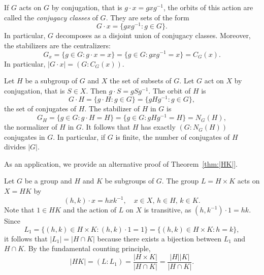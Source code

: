 \begin{example}
    If $G$ acts on $G$ by conjugation, that is $g\cdot x=gxg^{-1}$, the orbits of this action are called the \emph{conjugacy classes} 
    of $G$. They are sets of the form
        \[
        G\cdot x=\{gxg^{-1}:g\in G\}.
        \]
    In particular, $G$ decomposes as a disjoint union of conjugacy classes. Moreover, 
    the stabilizers are the centralizers:
        \[
        G_x=\{g\in G:g\cdot x=x\}=\{g\in G:gxg^{-1}=x\}=C_G(x).
        \]
    In particular, $|G\cdot x|=(G:C_G(x))$.
\end{example}

\begin{example}
\label{xca:counting_conjugates}
    Let $H$ be a subgroup of $G$ and $X$ the set of subsets of $G$. Let $G$ act on 
    $X$ by conjugation, that is $S\in X$. Then
        $g\cdot S=gSg^{-1}$. The orbit of $H$ 
        is 
        \[
        G\cdot H=\{g\cdot H:g\in G\}=\{gHg^{-1}:g\in G\},
        \]
        the set of conjugates of $H$. The stabilizer of $H$ in $G$ 
        is 
        \[
        G_H=\{g\in G:g\cdot H=H\}=\{g\in G:gHg^{-1}=H\}=N_G(H),
        \]
        the normalizer of $H$ in $G$. It follows that
        $H$ has exactly $(G:N_G(H))$ conjugates in $G$. In particular,
        if $G$ is finite, 
        the number of conjugates of $H$ divides $|G|$. 
\end{example}

As an application, we provide an alternative proof
of Theorem~\ref{thm:|HK|}. 

\begin{example}
\label{exa:for_HK}
Let $G$ be a group and $H$ and $K$ be subgroups of $G$. 
The group $L=H\times K$ acts on $X=HK$ by 
\[
(h,k)\cdot x=hxk^{-1},\quad x\in X,\,h\in H,\,k\in K.
\]
Note that $1\in HK$ and the action of $L$ on $X$ is transitive, as 
$(h,k^{-1})\cdot 1 = hk$. Since 
\[
L_1=\{(h,k)\in H\times K: (h,k)\cdot 1=1\}=\{(h,k)\in H\times K:h=k\},
\]
it follows that $|L_1|=|H\cap K|$ because there exists a bijection
between $L_1$ and 
$H\cap K$. By the fundamental counting principle, 
\[
|HK|=(L:L_1)=\frac{|H\times K|}{|H\cap K|}=\frac{|H||K|}{|H\cap K|}.
\]
\end{example}
